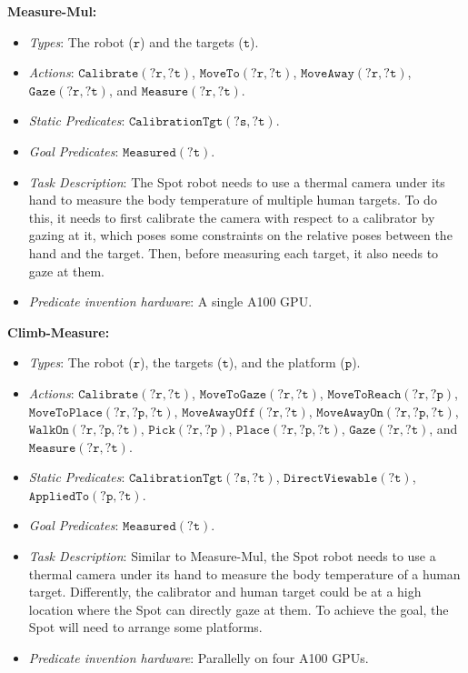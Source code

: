 \textbf{Measure-Mul:}
\begin{itemize}
    \item \textit{Types}: The robot ($\mathtt{r}$) and the targets ($\mathtt{t}$). 
    \item \textit{Actions}: $\mathtt{Calibrate(?r,?t)}$, $\mathtt{MoveTo(?r,?t)}$, $\mathtt{MoveAway(?r,?t)}$, $\mathtt{Gaze(?r,?t)}$, and $\mathtt{Measure(?r,?t)}$.
    \item \textit{Static Predicates}: $\mathtt{CalibrationTgt(?s,?t)}$.
    \item \textit{Goal Predicates}: $\mathtt{Measured(?t)}$.
    \item \textit{Task Description}: The Spot robot needs to use a thermal camera under its hand to measure the body temperature of multiple human targets.
    To do this, it needs to first calibrate the camera with respect to a calibrator by gazing at it, which poses some constraints on the relative poses between the hand and the target.
    Then, before measuring each target, it also needs to gaze at them.
    \item \textit{Predicate invention hardware}: A single A100 GPU.
\end{itemize}

\textbf{Climb-Measure:}
\begin{itemize}
    \item \textit{Types}: The robot ($\mathtt{r}$), the targets ($\mathtt{t}$), and the platform ($\mathtt{p}$).
    \item \textit{Actions}: $\mathtt{Calibrate(?r,?t)}$, $\mathtt{MoveToGaze(?r,?t)}$, $\mathtt{MoveToReach(?r,?p)}$, $\mathtt{MoveToPlace(?r,?p,?t)}$, $\mathtt{MoveAwayOff(?r,?t)}$, $\mathtt{MoveAwayOn(?r,?p,?t)}$, $\mathtt{WalkOn(?r,?p,?t)}$, $\mathtt{Pick(?r,?p)}$, $\mathtt{Place(?r,?p,?t)}$, $\mathtt{Gaze(?r,?t)}$, and $\mathtt{Measure(?r,?t)}$.
    \item \textit{Static Predicates}: $\mathtt{CalibrationTgt(?s,?t)}$, $\mathtt{DirectViewable(?t)}$, $\mathtt{AppliedTo(?p,?t)}$.
    \item \textit{Goal Predicates}: $\mathtt{Measured(?t)}$.
    \item \textit{Task Description}: Similar to Measure-Mul, the Spot robot needs to use a thermal camera under its hand to measure the body temperature of a human target.
    Differently, the calibrator and human target could be at a high location where the Spot can directly gaze at them.
    To achieve the goal, the Spot will need to arrange some platforms.
    \item \textit{Predicate invention hardware}: Parallelly on four A100 GPUs.
\end{itemize}

